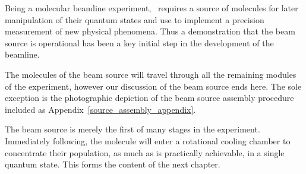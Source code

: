 
Being a molecular beamline experiment, \CENTREX\ requires a source of molecules
for later manipulation of their quantum states and use to implement a precision
measurement of new physical phenomena. Thus a demonstration that the beam source
is operational has been a key initial step in the development of the beamline.


The molecules of the beam source will travel through all the remaining modules
of the experiment, however our discussion of the beam source ends here. The sole
exception is the photographic depiction of the beam source
assembly procedure included as Appendix~\ref{source_assembly_appendix}.


The beam source is merely the first of many stages in the experiment.
Immediately following, the molecule will enter a rotational cooling chamber to
concentrate their population, as much as is practically achievable, in a single
quantum state. This forms the content of the next chapter.
